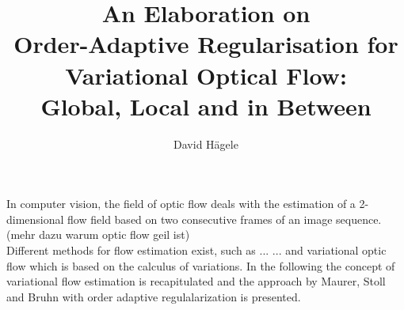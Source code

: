 \documentclass[journal]{vgtc}
\author{David H\"agele}
\title{An Elaboration on\\Order-Adaptive Regularisation for Variational Optical Flow:\\Global, Local and in Between}
\begin{document}


\maketitle

In computer vision, the field of optic flow deals with the estimation of a 2-dimensional flow field based on two consecutive frames of an image sequence.
\\(mehr dazu warum optic flow geil ist)\\
Different methods for flow estimation exist, such as ... ... and variational optic flow which is based on the calculus of variations.
In the following the concept of variational flow estimation is recapitulated and the approach by Maurer, Stoll and Bruhn \cite{daspaper} with order adaptive regulalarization is presented.
\end{document}
